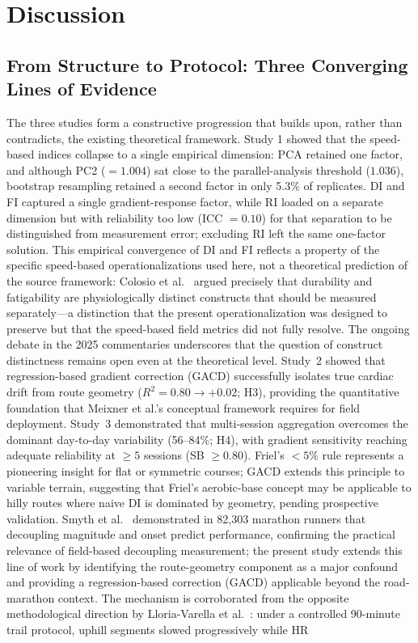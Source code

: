 \documentclass[times, twoside]{zHenriquesLab-StyleBioRxiv}
\begin{document}
\section*{Discussion}

\subsection*{From Structure to Protocol: Three Converging Lines of Evidence}

The three studies form a constructive progression that builds upon, rather than contradicts, the existing theoretical framework. Study 1 showed that the speed-based indices collapse to a single empirical dimension: PCA retained one factor, and although PC2 ($= 1.004$) sat close to the parallel-analysis threshold ($1.036$), bootstrap resampling retained a second factor in only 5.3\% of replicates. DI and FI captured a single gradient-response factor, while RI loaded on a separate dimension but with reliability too low (ICC $= 0.10$) for that separation to be distinguished from measurement error; excluding RI left the same one-factor solution. This empirical convergence of DI and FI reflects a property of the specific speed-based operationalizations used here, not a theoretical prediction of the source framework: Colosio et al.\ \cite{colosio2025} argued precisely that durability and fatigability are physiologically distinct constructs that should be measured separately---a distinction that the present operationalization was designed to preserve but that the speed-based field metrics did not fully resolve. The ongoing debate in the 2025 commentaries \cite{faude2025, lucernoni2025, meixner2025last} underscores that the question of construct distinctness remains open even at the theoretical level. Study~2 showed that regression-based gradient correction (GACD) successfully isolates true cardiac drift from route geometry ($R^2 = 0.80 \rightarrow +0.02$; H3), providing the quantitative foundation that Meixner et al.'s conceptual framework requires for field deployment. Study~3 demonstrated that multi-session aggregation overcomes the dominant day-to-day variability (56--84\%; H4), with gradient sensitivity reaching adequate reliability at $\geq 5$ sessions (SB $\geq 0.80$). Friel's $< 5\%$ rule \cite{friel2009} represents a pioneering insight for flat or symmetric courses; GACD extends this principle to variable terrain, suggesting that Friel's aerobic-base concept may be applicable to hilly routes where naive DI is dominated by geometry, pending prospective validation. Smyth et al.\ \cite{smyth2022} demonstrated in 82,303 marathon runners that decoupling magnitude and onset predict performance, confirming the practical relevance of field-based decoupling measurement; the present study extends this line of work by identifying the route-geometry component as a major confound and providing a regression-based correction (GACD) applicable beyond the road-marathon context. The mechanism is corroborated from the opposite methodological direction by Lloria-Varella et al.\ \cite{lloria2025}: under a controlled 90-minute trail protocol, uphill segments slowed progressively while HR 
\end{document}
